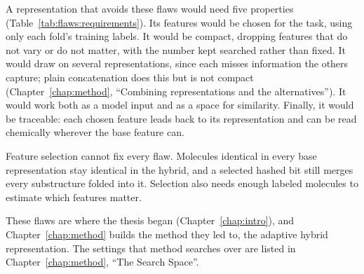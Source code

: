 A representation that avoids these flaws would need five properties (Table~\ref{tab:flaws:requirements}). Its features would be chosen for the task, using only each fold's training labels. It would be compact, dropping features that do not vary or do not matter, with the number kept searched rather than fixed. It would draw on several representations, since each misses information the others capture; plain concatenation does this but is not compact (Chapter~\ref{chap:method}, ``Combining representations and the alternatives''). It would work both as a model input and as a space for similarity. Finally, it would be traceable: each chosen feature leads back to its representation and can be read chemically wherever the base feature can.

Feature selection cannot fix every flaw. Molecules identical in every base representation stay identical in the hybrid, and a selected hashed bit still merges every substructure folded into it. Selection also needs enough labeled molecules to estimate which features matter.

These flaws are where the thesis began (Chapter~\ref{chap:intro}), and Chapter~\ref{chap:method} builds the method they led to, the adaptive hybrid representation. The settings that method searches over are listed in Chapter~\ref{chap:method}, ``The Search Space''.



